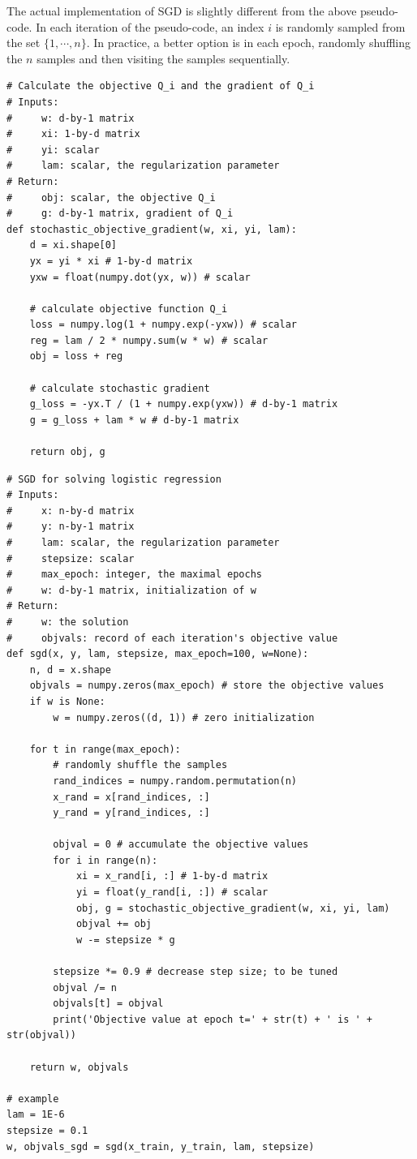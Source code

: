 \documentclass[11pt]{article}
\numberwithin{equation}{section}
\begin{document}
The actual implementation of SGD is slightly different from the above pseudo-code.
In each iteration of the pseudo-code, an index $i$ is randomly sampled from the set $\{ 1, \cdots , n \}$.
In practice, a better option is in each epoch, randomly shuffling the $n$ samples and then visiting the samples sequentially.




\vspace{3mm}
\begin{lstlisting}
# Calculate the objective Q_i and the gradient of Q_i
# Inputs:
#     w: d-by-1 matrix
#     xi: 1-by-d matrix
#     yi: scalar
#     lam: scalar, the regularization parameter
# Return:
#     obj: scalar, the objective Q_i
#     g: d-by-1 matrix, gradient of Q_i
def stochastic_objective_gradient(w, xi, yi, lam):
	d = xi.shape[0]
	yx = yi * xi # 1-by-d matrix
	yxw = float(numpy.dot(yx, w)) # scalar
	
	# calculate objective function Q_i
	loss = numpy.log(1 + numpy.exp(-yxw)) # scalar
	reg = lam / 2 * numpy.sum(w * w) # scalar
	obj = loss + reg
	
	# calculate stochastic gradient
	g_loss = -yx.T / (1 + numpy.exp(yxw)) # d-by-1 matrix
	g = g_loss + lam * w # d-by-1 matrix
	
	return obj, g
\end{lstlisting}
\vspace{3mm}



\vspace{3mm}
\begin{lstlisting}
# SGD for solving logistic regression
# Inputs:
#     x: n-by-d matrix
#     y: n-by-1 matrix
#     lam: scalar, the regularization parameter
#     stepsize: scalar
#     max_epoch: integer, the maximal epochs
#     w: d-by-1 matrix, initialization of w
# Return:
#     w: the solution
#     objvals: record of each iteration's objective value
def sgd(x, y, lam, stepsize, max_epoch=100, w=None):
	n, d = x.shape
	objvals = numpy.zeros(max_epoch) # store the objective values
	if w is None:
		w = numpy.zeros((d, 1)) # zero initialization
	
	for t in range(max_epoch):
		# randomly shuffle the samples
		rand_indices = numpy.random.permutation(n)
		x_rand = x[rand_indices, :]
		y_rand = y[rand_indices, :]
		
		objval = 0 # accumulate the objective values
		for i in range(n):
			xi = x_rand[i, :] # 1-by-d matrix
			yi = float(y_rand[i, :]) # scalar
			obj, g = stochastic_objective_gradient(w, xi, yi, lam)
			objval += obj
			w -= stepsize * g
		
		stepsize *= 0.9 # decrease step size; to be tuned
		objval /= n
		objvals[t] = objval
		print('Objective value at epoch t=' + str(t) + ' is ' + str(objval))
	
	return w, objvals
	
# example
lam = 1E-6
stepsize = 0.1
w, objvals_sgd = sgd(x_train, y_train, lam, stepsize)
\end{lstlisting}
\vspace{3mm}
\end{document}
